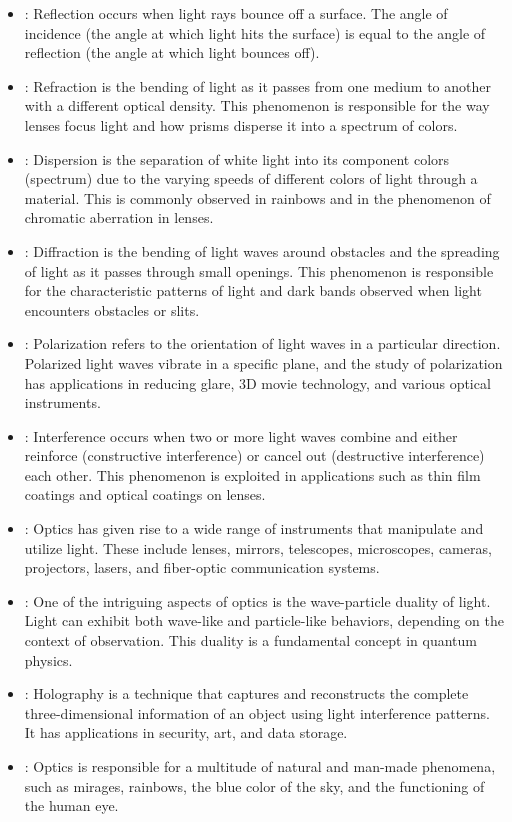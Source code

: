 \begin{itemize}
    \item {}: Reflection occurs when light rays bounce off a surface. The angle of incidence (the angle at which light hits the surface) is equal to the angle of reflection (the angle at which light bounces off).
    \item {}: Refraction is the bending of light as it passes from one medium to another with a different optical density. This phenomenon is responsible for the way lenses focus light and how prisms disperse it into a spectrum of colors.
    \item {}: Dispersion is the separation of white light into its component colors (spectrum) due to the varying speeds of different colors of light through a material. This is commonly observed in rainbows and in the phenomenon of chromatic aberration in lenses.
    \item {}: Diffraction is the bending of light waves around obstacles and the spreading of light as it passes through small openings. This phenomenon is responsible for the characteristic patterns of light and dark bands observed when light encounters obstacles or slits.
    \item {}: Polarization refers to the orientation of light waves in a particular direction. Polarized light waves vibrate in a specific plane, and the study of polarization has applications in reducing glare, 3D movie technology, and various optical instruments.
    \item {}: Interference occurs when two or more light waves combine and either reinforce (constructive interference) or cancel out (destructive interference) each other. This phenomenon is exploited in applications such as thin film coatings and optical coatings on lenses.
    \item {}: Optics has given rise to a wide range of instruments that manipulate and utilize light. These include lenses, mirrors, telescopes, microscopes, cameras, projectors, lasers, and fiber-optic communication systems.
    \item {}: One of the intriguing aspects of optics is the wave-particle duality of light. Light can exhibit both wave-like and particle-like behaviors, depending on the context of observation. This duality is a fundamental concept in quantum physics.
    \item {}: Holography is a technique that captures and reconstructs the complete three-dimensional information of an object using light interference patterns. It has applications in security, art, and data storage.
    \item {}: Optics is responsible for a multitude of natural and man-made phenomena, such as mirages, rainbows, the blue color of the sky, and the functioning of the human eye.
\end{itemize}







